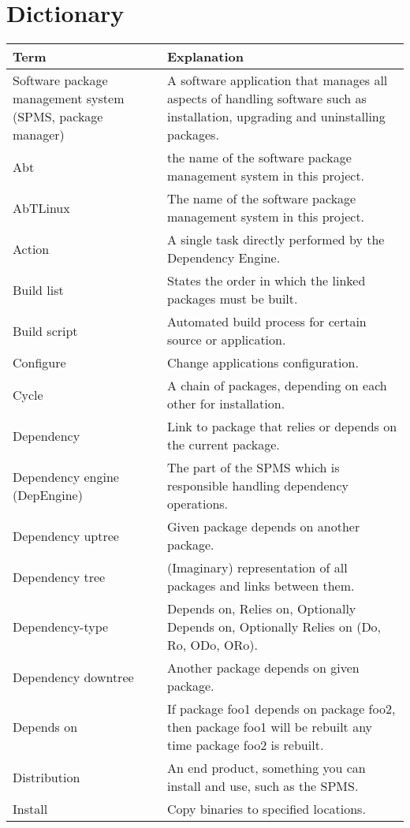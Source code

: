 \section{Dictionary}

\begin{tabular}[t]{|p{4.5cm}|p{8.5cm}|}
\hline
\textbf{Term} & \textbf{Explanation} \\
\hline
Software package management system (SPMS, package manager) & A software application that manages all aspects of handling software such as installation, upgrading and uninstalling packages.\\
\hline
Abt & the name of the software package management system in this project.\\
\hline
AbTLinux & The name of the software package management system in this project.\\
\hline
Action & A single task directly performed by the Dependency Engine.\\
\hline
Build list & States the order in which the linked packages must be built.\\
\hline
Build script & Automated build process for certain source or application.\\
\hline
Configure & Change applications configuration.\\
\hline
Cycle & A chain of packages, depending on each other for installation.\\
\hline
Dependency & Link to package that relies or depends on the current package.\\
\hline
Dependency engine (DepEngine) & The part of the SPMS which is responsible handling dependency operations.\\
\hline
Dependency uptree & Given package depends on another package.\\
\hline
Dependency tree & (Imaginary) representation of all packages and links between them.\\
\hline
Dependency-type & Depends on, Relies on, Optionally Depends on, Optionally Relies on (Do, Ro, ODo, ORo).\\
\hline
Dependency downtree & Another package depends on given package.\\
\hline
Depends on & If package foo1 depends on package foo2, then package foo1 will be rebuilt any time package foo2 is rebuilt.\\
\hline
Distribution & An end product, something you can install and use, such as the SPMS.\\
\hline
Install & Copy binaries to specified locations.\\

\end{tabular}
